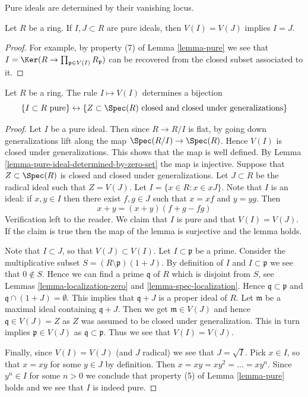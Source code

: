 \begin{lemma}
\label{lemma-pure-ideal-determined-by-zero-set}
\begin{slogan}
Pure ideals are determined by their vanishing locus.
\end{slogan}
Let $R$ be a ring.
If $I, J \subset R$ are pure ideals, then $V(I) = V(J)$
implies $I = J$.
\end{lemma}

\begin{proof}
For example, by property (7) of
Lemma \ref{lemma-pure}
we see that
$I = \Ker(R \to \prod_{\mathfrak p \in V(I)} R_{\mathfrak p})$
can be recovered from the closed subset associated to it.
\end{proof}

\begin{lemma}
\label{lemma-pure-open-closed-specializations}
Let $R$ be a ring. The rule
$I \mapsto V(I)$
determines a bijection
$$
\{I \subset R \text{ pure}\}
\leftrightarrow
\{Z \subset \Spec(R)\text{ closed and closed under generalizations}\}
$$
\end{lemma}

\begin{proof}
Let $I$ be a pure ideal. Then since $R \to R/I$ is flat, by going down
generalizations lift along the map $\Spec(R/I) \to \Spec(R)$.
Hence $V(I)$ is closed under generalizations. This shows that the map
is well defined. By
Lemma \ref{lemma-pure-ideal-determined-by-zero-set}
the map is injective. Suppose that
$Z \subset \Spec(R)$ is closed and closed under generalizations.
Let $J \subset R$ be the radical ideal such that $Z = V(J)$.
Let $I = \{x \in R : x \in xJ\}$. Note that $I$ is an ideal:
if $x, y \in I$ then there exist $f, g \in J$ such that
$x = xf$ and $y = yg$. Then
$$
x + y = (x + y)(f + g - fg)
$$
Verification left to the reader.
We claim that $I$ is pure and that $V(I) = V(J)$.
If the claim is true then the map of the lemma is surjective and
the lemma holds.

\medskip\noindent
Note that $I \subset J$, so that $V(J) \subset V(I)$.
Let $I \subset \mathfrak p$ be a prime. Consider the multiplicative
subset $S = (R \setminus \mathfrak p)(1 + J)$. By definition of
$I$ and $I \subset \mathfrak p$ we see that $0 \not \in S$.
Hence we can find a prime $\mathfrak q$ of $R$ which is disjoint
from $S$, see
Lemmas \ref{lemma-localization-zero} and
\ref{lemma-spec-localization}.
Hence $\mathfrak q \subset \mathfrak p$ and
$\mathfrak q \cap (1 + J) = \emptyset$.
This implies that $\mathfrak q + J$ is a proper ideal of $R$.
Let $\mathfrak m$ be a maximal ideal containing $\mathfrak q + J$.
Then we get
$\mathfrak m \in V(J)$ and hence $\mathfrak q \in V(J) = Z$
as $Z$ was assumed to be closed under generalization.
This in turn implies $\mathfrak p \in V(J)$ as
$\mathfrak q \subset \mathfrak p$. Thus we see that $V(I) = V(J)$.

\medskip\noindent
Finally, since $V(I) = V(J)$ (and $J$ radical) we see that $J = \sqrt{I}$.
Pick $x \in I$, so that $x = xy$ for some $y \in J$ by definition.
Then $x = xy = xy^2 = \ldots = xy^n$. Since $y^n \in I$ for some $n > 0$
we conclude that property (5) of
Lemma \ref{lemma-pure}
holds and we see that $I$ is indeed pure.
\end{proof}

